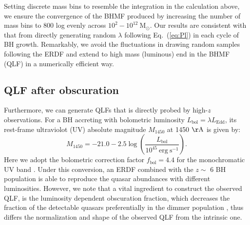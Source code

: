 \documentclass[twocolumn, twocolappendix]{aastex63}
\newcommand{\Msun}{\mathrm{M_\odot}}
\newcommand{\Muv}{M_{1450}}
\newcommand{\Lbol}{L_\mathrm{bol}}
\newcommand{\fbol}{f_\mathrm{bol}}
\begin{document}
\begin{CJK*}{UTF8}{gbsn}
Setting discrete mass bins to resemble the integration in the calculation above, 
we ensure the convergence of the BHMF produced by increasing the number of mass bins to 800 log evenly across $10^2-10^{12}~\Msun$. 
Our results are consistent with that from directly generating random $\lambda$ 
following Eq.~(\ref{eq:Pl}) in each cycle of BH growth. 
Remarkably, we avoid the fluctuations in drawing random samples following the ERDF 
and extend to high mass (luminous) end in the BHMF (QLF) in a numerically efficient way.


\vspace{2mm}
\subsection{QLF after obscuration}\label{sec:LF}
Furthermore, we can generate QLFs that is directly probed by high-$z$ observations.
For a BH accreting with bolometric luminosity $\Lbol=\lambda L_\mathrm{Edd}$, 
its rest-frame ultraviolot (UV) absolute magnitude $\Muv$ 
at 1450 $\mathrm{\AA}$ is given by: 
\begin{equation}
  \label{eq:M1450}
  \Muv= -21.0-2.5 \log  \left(\frac{\Lbol}{10^{45}~\mathrm{erg~s}^{-1}} \right).
\end{equation}
Here we adopt the bolometric correction factor $\fbol=4.4$ for the monochromatic UV band \citep{2006ApJS..166..470R}.
Under this conversion, an ERDF combined with the $z\sim$ 6 BH population is able to reproduce 
the quasar abundances with different luminosities. 
However, we note that a vital ingredient to construct the observed QLF, 
is the luminosity dependent obscuration fraction, 
which decreases the fraction of the detectable quasars preferentially in the dimmer population 
\citep{2003ApJ...598..886U,2014ApJ...786..104U,2008A&A...490..905H,2014MNRAS.437.3550M}, 
thus differs the normalization and shape of the observed QLF from the intrinsic one.


\end{CJK*}
\end{document}
